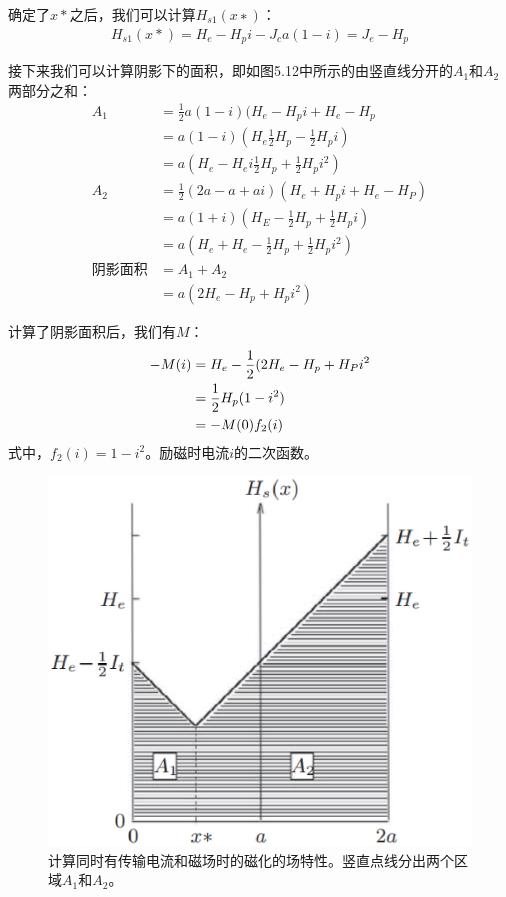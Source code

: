 确定了$x*$之后，我们可以计算$H_{s1}(x∗)$：
\begin{align*}%
H_{s1}(x*)=H_{e}-H_{p}i-J_{c}a(1-i)=J_{e}-H_{p}
\end{align*}

接下来我们可以计算阴影下的面积，即如图5.12中所示的由竖直线分开的$A_1$和$A_2$两部分之和：
\begin{align*}%
A_{1}&=\frac{1}{2}a(1-i)(H_{e}-H_{p}i+H_{e}-H_{p}\\
&=a(1-i)(H_{e}\frac{1}{2}H_{p}-\frac{1}{2}H_{p}i)\\
&=a(H_{e}-H_{e}i\frac{1}{2}H_{p}+\frac{1}{2}H_{p}i^{2})\\
A_{2}&=\frac{1}{2}(2a-a+ai)(H_{e}+H_{p}i+H_{e}-H_{P})\\
&=a(1+i)(H_E-\frac{1}{2}H_{p}+\frac{1}{2}H_{p}i)\\
&=a(H_{e}+H_{e}-\frac{1}{2}H_{p}+\frac{1}{2}H_{p}i^{2})\\
\mbox{阴影面积}&=A_{1}+A_{2}\\
&=a(2H_{e}-H_{p}+H_{p}i^{2})
\end{align*}

计算了阴影面积后，我们有$M$：
\begin{subequations}
	\begin{align}
-M(i)&=H_{e}-\frac{1}{2}(2H_{e}-H_{p}+H_{P}i^{2}\\\notag
&=\frac{1}{2}H_{p}(1-i^{2})\\
&=-M(0)f_{2}(i)
	\end{align}
\end{subequations}
式中，$f_2(i) = 1 − i^2$。励磁时电流$i$的二次函数。

\begin{figure}[htbp]
	\centering
	\includegraphics[scale=0.5]{chpt5/figs/fig5.12.eps}
	\caption{计算同时有传输电流和磁场时的磁化的场特性。竖直点线分出两个区域$A_1$和$A_2$。}
\end{figure}


